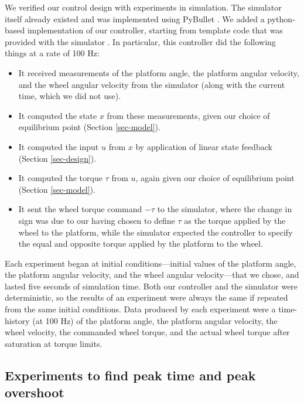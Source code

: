 \documentclass[conf]{new-aiaa}
\begin{document}
We verified our control design with experiments in simulation.
The simulator itself already existed and was implemented using PyBullet \cite{coumans2021}.
We added a python-based implementation of our controller, starting from template code that was provided with the simulator \cite{ae353software}.
In particular, this controller did the following things at a rate of 100 Hz:
\begin{itemize}

\item It received measurements of the platform angle, the platform angular velocity, and the wheel angular velocity from the simulator (along with the current time, which we did not use).

\item It computed the state $x$ from these measurements, given our choice of equilibrium point (Section \ref{sec-model}).

\item It computed the input $u$ from $x$ by application of linear state feedback (Section \ref{sec-design}).

\item It computed the torque $\tau$ from $u$, again given our choice of equilibrium point (Section \ref{sec-model}).

\item It sent the wheel torque command $-\tau$ to the simulator, where the change in sign was due to our having chosen to define $\tau$ as the torque applied by the wheel to the platform, while the simulator expected the controller to specify the equal and opposite torque applied by the platform to the wheel.

\end{itemize}
Each experiment began at initial conditions---initial values of the platform angle, the platform angular velocity, and the wheel angular velocity---that we chose, and lasted five seconds of simulation time. Both our controller and the simulator were deterministic, so the results of an experiment were always the same if repeated from the same initial conditions. Data produced by each experiment were a time-history (at 100 Hz) of the platform angle, the platform angular velocity, the wheel velocity, the commanded wheel torque, and the actual wheel torque after saturation at torque limits.

\subsection{Experiments to find peak time and peak overshoot}
\label{sec-peak}
\end{document}
